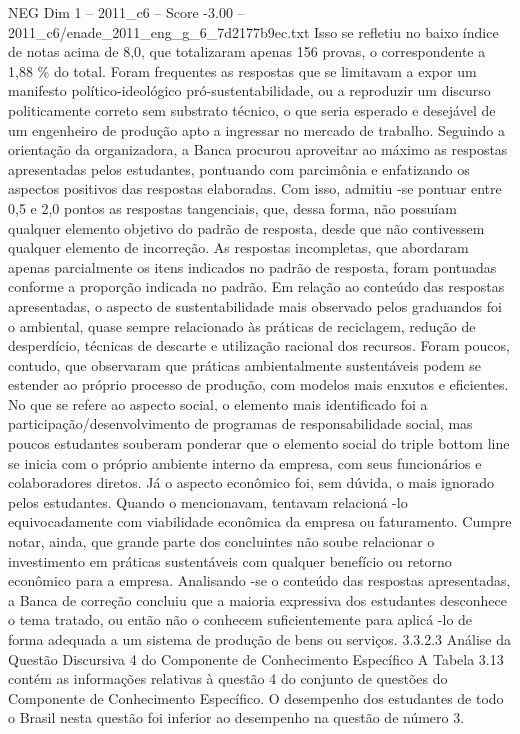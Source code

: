 \begin{textsample}{NEG Dim 1 – 2011\_c6 – Score -3.00 – 2011\_c6/enade\_2011\_eng\_g\_6\_7d2177b9ec.txt}
Isso se refletiu no baixo índice de notas acima de 8,0, que totalizaram apenas 156 provas, o correspondente a 1,88 \% do total.
Foram frequentes as respostas que se limitavam a expor um manifesto político-ideológico pró-sustentabilidade, ou a reproduzir um discurso politicamente correto sem substrato técnico, o que seria esperado e desejável de um engenheiro de produção apto a ingressar no mercado de trabalho.
Seguindo a orientação da organizadora, a Banca procurou aproveitar ao máximo as respostas apresentadas pelos estudantes, pontuando com parcimônia e enfatizando os aspectos positivos das respostas elaboradas.
Com isso, admitiu -se pontuar entre 0,5 e 2,0 pontos as respostas tangenciais, que, dessa forma, não possuíam qualquer elemento objetivo do padrão de resposta, desde que não contivessem qualquer elemento de incorreção.
As respostas incompletas, que abordaram apenas parcialmente os itens indicados no padrão de resposta, foram pontuadas conforme a proporção indicada no padrão.
Em relação ao conteúdo das respostas apresentadas, o aspecto de sustentabilidade mais observado pelos graduandos foi o ambiental, quase sempre relacionado às práticas de reciclagem, redução de desperdício, técnicas de descarte e utilização racional dos recursos.
Foram poucos, contudo, que observaram que práticas ambientalmente sustentáveis podem se estender ao próprio processo de produção, com modelos mais enxutos e eficientes.
No que se refere ao aspecto social, o elemento mais identificado foi a participação/desenvolvimento de programas de responsabilidade social, mas poucos estudantes souberam ponderar que o elemento social do triple bottom line se inicia com o próprio ambiente interno da empresa, com seus funcionários e colaboradores diretos.
Já o aspecto econômico foi, sem dúvida, o mais ignorado pelos estudantes.
Quando o mencionavam, tentavam relacioná -lo equivocadamente com viabilidade econômica da empresa ou faturamento.
Cumpre notar, ainda, que grande parte dos concluintes não soube relacionar o investimento em práticas sustentáveis com qualquer benefício ou retorno econômico para a empresa.
Analisando -se o conteúdo das respostas apresentadas, a Banca de correção concluiu que a maioria expressiva dos estudantes desconhece o tema tratado, ou então não o conhecem suficientemente para aplicá -lo de forma adequada a um sistema de produção de bens ou serviços. 3.3.2.3 Análise da Questão Discursiva 4 do Componente de Conhecimento Específico A Tabela 3.13 contém as informações relativas à questão 4 do conjunto de questões do Componente de Conhecimento Específico.
O desempenho dos estudantes de todo o Brasil nesta questão foi inferior ao desempenho na questão de número 3.

\end{textsample}
